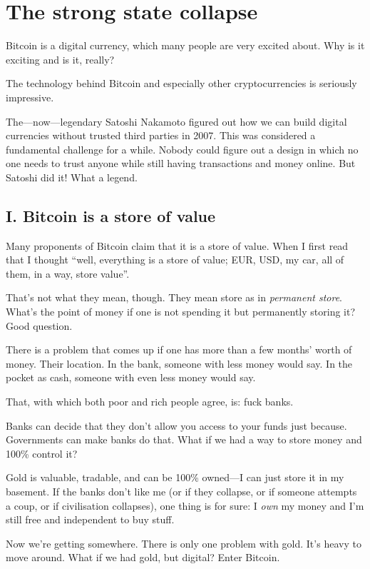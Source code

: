 \section{The strong state collapse}

Bitcoin is a digital currency, which many people are very excited about. Why is it exciting and is it, really?

The technology behind Bitcoin and especially other cryptocurrencies is seriously impressive.

The—now—legendary Satoshi Nakamoto figured out how we can build digital currencies without trusted third parties in 2007. This was considered a fundamental challenge for a while. Nobody could figure out a design in which no one needs to trust anyone while still having transactions and money online. But Satoshi did it! What a legend.

\subsection{I. Bitcoin is a store of value}

Many proponents of Bitcoin claim that it is a store of value. When I first read that I thought “well, everything is a store of value; EUR, USD, my car, all of them, in a way, store value”.

That’s not what they mean, though. They mean store as in \emph{permanent store}. What’s the point of money if one is not spending it but permanently storing it? Good question.

There is a problem that comes up if one has more than a few months’ worth of money. Their location. In the bank, someone with less money would say. In the pocket as cash, someone with even less money would say.

That, with which both poor and rich people agree, is: fuck banks.

Banks can decide that they don’t allow you access to your funds just because. Governments can make banks do that. What if we had a way to store money and 100\% control it?

Gold is valuable, tradable, and can be 100\% owned—I can just store it in my basement. If the banks don’t like me (or if they collapse, or if someone attempts a coup, or if civilisation collapses), one thing is for sure: I \emph{own} my money and I’m still free and independent to buy stuff.

Now we’re getting somewhere. There is only one problem with gold. It’s heavy to move around. What if we had gold, but digital? Enter Bitcoin.

